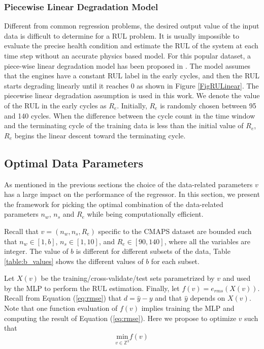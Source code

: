 \documentclass[preprint,12pt]{elsarticle}%
\begin{document}
\subsubsection{Piecewise Linear Degradation Model}

Different from common regression problems, the desired output value of the
input data is difficult to determine for a RUL problem. It is usually
impossible to evaluate the precise health condition and estimate the RUL of
the system at each time step without an accurate physics based model. For this
popular dataset, a piece-wise linear degradation model has been proposed in
\cite{Ramasso2014}. The model assumes that the engines have a constant RUL
label in the early cycles, and then the RUL starts degrading linearly until it
reaches 0 as shown in Figure \ref{FigRULinear}. The piecewise linear
degradation assumption is used in this work. We denote the value of the RUL in
the early cycles as $R_{e}$. Initially,  $R_{e}$ is randomly chosen between 95 and 140 
cycles. When the difference between the cycle count in the time window and the terminating cycle 
of the training data is less than the initial value of $R_{e}$, $R_{e}$ begins the linear 
descent toward the terminating cycle.

\subsection{Optimal Data Parameters}

\label{sec:otimal_data_params}

As mentioned in the previous sections the choice of the data-related
parameters $v$ has a large impact on the performance of the regressor. In this
section, we present the framework for picking the optimal combination of the
data-related parameters $n_{w}$, $n_{s}$ and $R_{e}$ while being
computationally efficient.

Recall that $v = (n_{w}, n_{s}, R_{e})$ specific to the CMAPS dataset are
bounded such that $n_{w} \in\left[  1, b\right]  $, $n_{s} \in\left[  1,
10\right]  $, and $R_{e} \in\left[  90, 140 \right]  $, where all the
variables are integer. The value of $b$ is different for different subsets of
the data, Table \ref{table:b_values} shows the different values of $b$ for
each subset.

Let $X(v)$ be the training/cross-validate/test sets parametrized by $v$ and
used by the MLP to perform the RUL estimation. Finally, let $f(v)=e_{rms}%
(X(v))$. Recall from Equation (\ref{eq:rmse}) that $d = \hat{y} - y$ and that
$\hat{y}$ depends on $X(v)$. Note that one function evaluation of $f(v)$
implies training the MLP and computing the result of Equation (\ref{eq:rmse}).
Here we propose to optimize $v$ such that
\begin{equation}
\underset{v \in\mathbb{Z}^{3}}{\mathrm{min}} f(v)
\label{eq:optimization_problem}%
\end{equation}
\end{document}
